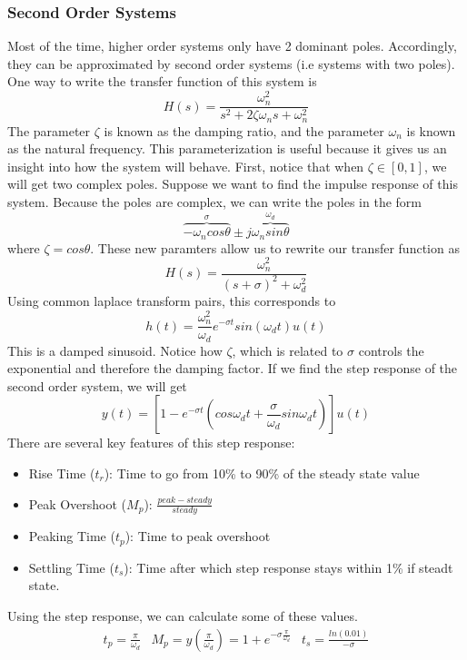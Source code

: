 \documentclass{article}
\begin{document}
\subsubsection{Second Order Systems}
Most of the time, higher order systems only have 2 dominant poles. Accordingly, they can be approximated by second order systems (i.e systems with two poles).
One way to write the transfer function of this system is
$$H(s)=\frac{\omega_n^2}{s^2+2\zeta\omega_ns+\omega_n^2}$$
The parameter $\zeta$ is known as the damping ratio, and the parameter $\omega_n$ is known as the natural frequency.
This parameterization is useful because it gives us an insight into how the system will behave. First, notice that when
$\zeta \in [0, 1]$, we will get two complex poles. Suppose we want to find the impulse response of this system. Because the poles are complex, 
we can write the poles in the form
$$\overbrace{-\omega_ncos\theta}^{\sigma} \pm j\overbrace{\omega_nsin\theta}^{\omega_d}$$
where $\zeta=cos\theta$. These new paramters allow us to rewrite our transfer function as
$$H(s) = \frac{\omega_n^2}{(s+\sigma)^2+\omega_d^2}$$
Using common laplace transform pairs, this corresponds to
$$h(t) = \frac{\omega_n^2}{\omega_d}e^{-\sigma t}sin(\omega_dt)u(t)$$
This is a damped sinusoid. Notice how $\zeta$, which is related to $\sigma$ controls the exponential and therefore the damping factor.
If we find the step response of the second order system, we will get
$$y(t) = \left[1-e^{-\sigma t}\left(cos\omega_dt+\frac{\sigma}{\omega_d}sin\omega_dt\right)\right]u(t)$$
There are several key features of this step response:
\begin{itemize}
    \item Rise Time ($t_r$): Time to go from 10\% to 90\% of the steady state value
    \item Peak Overshoot ($M_p$): $\frac{peak - steady}{steady}$
    \item Peaking Time ($t_p$): Time to peak overshoot
    \item Settling Time ($t_s$): Time after which step response stays within 1\% if steadt state.
\end{itemize}
Using the step response, we can calculate some of these values.
\[
    \begin{array}{ccc}
        t_p=\frac{\pi}{\omega_d} & M_p=y\left(\frac{\pi}{\omega_d}\right)=1+e^{-\sigma\frac{\pi}{\omega_d}} & t_s = \frac{ln(0.01)}{-\sigma}
    \end{array}
\]
\end{document}
